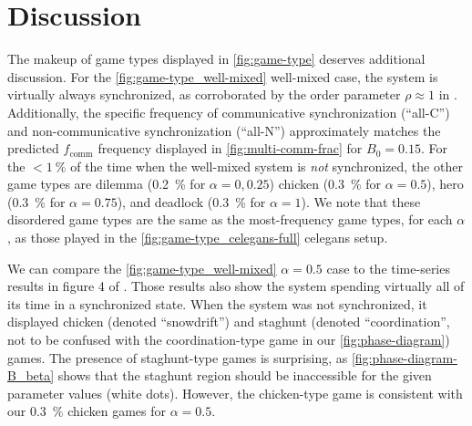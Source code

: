 \documentclass[pdflatex,twocolumn,sn-nature,super]{sn-jnl}
\begin{document}
\section{Discussion}\label{sec:discussion}

The makeup of game types displayed in \cref{fig:game-type}
deserves additional discussion.
For the \cref{fig:game-type_well-mixed} well-mixed case,
the system is virtually always synchronized,
as corroborated by the order parameter $\rho \approx 1$ in
.
Additionally, the specific frequency of communicative synchronization (``all-C'')
and non-communicative synchronization (``all-N'')
approximately matches the predicted $f_{\text{comm}}$
frequency displayed in \cref{fig:multi-comm-frac} for $B_0=0.15$.
For the $< \SI{1}{\percent}$ of the time when the well-mixed system is
\emph{not} synchronized, the other game types are
dilemma (\SI{0.2}{\percent} for $\alpha = 0, 0.25$)
chicken (\SI{0.3}{\percent} for $\alpha = 0.5$),
hero (\SI{0.3}{\percent} for $\alpha = 0.75$),
and
deadlock (\SI{0.3}{\percent} for $\alpha = 1$).
We note that these disordered game types
are the same as the most-frequency game types,
for each $\alpha$, as those played in
the \cref{fig:game-type_celegans-full} \gls{celegans} setup.

We can compare the \cref{fig:game-type_well-mixed}
$\alpha = 0.5$ case
to the time-series results in figure 4 of \tripp{}.
Those results also show the system spending
virtually all of its time in a synchronized state.
When the \tripp{} system was not synchronized,
it displayed chicken (denoted ``snowdrift'')
and staghunt (denoted ``coordination'',
not to be confused with the coordination-type game
in our \cref{fig:phase-diagram}) games.
The presence of staghunt-type games is surprising,
as \cref{fig:phase-diagram-B_beta}
shows that the staghunt region should be inaccessible
for the given parameter values (white dots).
However, the chicken-type game is consistent with our
\SI{0.3}{\percent} chicken games for $\alpha = 0.5$.
\end{document}
